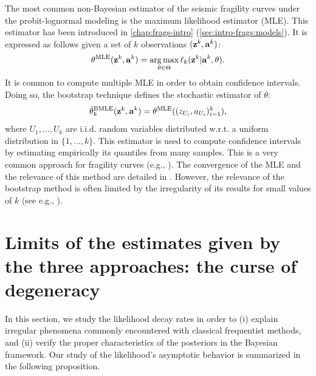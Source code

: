 The most common non-Bayesian estimator of the seismic fragility curves under the probit-lognormal modeling is the maximum likelihood estimator (MLE). This estimator has been introduced in   \cref{chap:frags-intro} (\cref{sec:intro-frags:models}). It is expressed as follows given a set of $k$ observations $(\mathbf{z}^k,\mathbf{a}^k)$:
    \begin{equation}
        \theta^{\text{MLE}}(\mathbf{z}^k,\mathbf{a}^k)=\operatorname*{arg\,max}_{\theta\in\Theta}\ell_k(\mathbf{z}^k|\mathbf{a}^k,\theta).
    \end{equation}
It is common to compute multiple MLE in order to obtain confidence intervals. Doing so, the bootstrap technique defines the stochastic estimator of $\theta$:
    \begin{equation}
        \hat\theta_k^{\text{BMLE}}(\mathbf{z}^k,\mathbf{a}^k) = \theta^{\text{MLE}}((z_{U_i},a_{U_i})_{i=1}^k),
    \end{equation}    
  where $U_1,\dots,U_k$ are i.i.d. random variables distributed w.r.t. a uniform distribution in $\{1,\dots,k\}$.
This estimator is used to compute confidence intervals by estimating empirically its quantiles from many samples. 
This is a very common approach for fragility curves (e.g., 
\cite{shinozuka_statistical_2000,gehl_influence_2015,baker_efficient_2015}). The convergence of the MLE and the relevance of this method are detailed in \cite{van_der_vaart_asymptotic_1992}. However, the relevance of the bootstrap method is often limited by the irregularity of its results for small values of $k$ (see e.g., \cite{zentner_fragility_2017}).





\section{Limits of the estimates given by the three approaches: the curse of degeneracy}\label{sec:PREM:degeneracy}

In this section, we study the likelihood decay rates in order to (i) explain irregular phenomena commonly encountered with classical frequentist methods, and (ii) verify the proper characteristics of the posteriors in the Bayesian framework.
Our study of the likelihood's asymptotic behavior is summarized in the following proposition.

